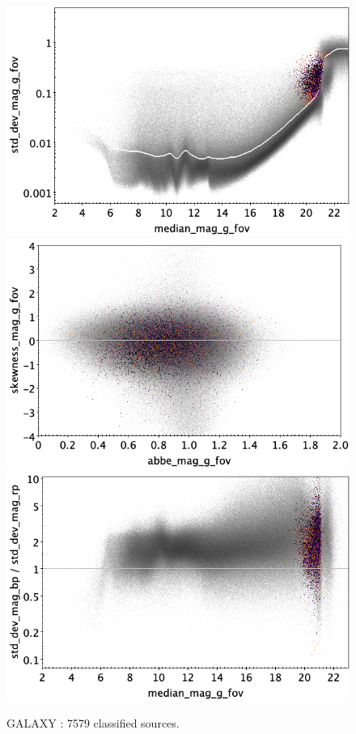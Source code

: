 \documentclass[longauth]{aa}
\def\gaia{\textit{Gaia}\xspace}
\begin{document}
\begin{appendix}
\begin{figure}
\hspace{2mm}
 \includegraphics[width=0.45\hsize]{figures/appendix/GALAXY_cls_msd.png} \\ %
\vspace{4mm}
 \includegraphics[width=0.45\hsize]{figures/appendix/GALAXY_cls_ask.png}  %
\hspace{2mm}
 \includegraphics[width=0.45\hsize]{figures/appendix/GALAXY_cls_msdr.png}  \\ %
\vspace{4mm}
 \caption{GALAXY \citep[subset of candidates in the \gaia Andromeda Photometric Survey;][]{DR3-DPACP-142}: 7579 classified sources.}  
 \label{fig:app:GALAXY}
\end{figure}

\end{appendix}
\end{document}
